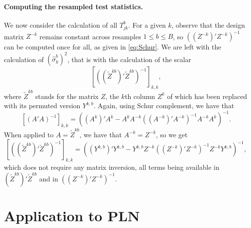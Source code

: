 \documentclass[a4paper, 10pt]{article}
\newcommand{\Zt}{\widetilde{Z}}
\begin{document}
\paragraph{Computing the resampled test statistics.}
We now consider the calculation of all $T_{jk}^b$. For a given $k$, observe that the design matrix $Z^{-k}$ remains constant across resamples $1 \leq b \leq B$, so $\left((Z^{-k})' Z^{-k}\right)^{-1}$ can be computed once for all, as given in \eqref{eq:Schur}. We are left with the calculation of $(\widehat{\sigma}^b_k)^2$, that is with the calculation of the scalar
$$
\left[\left((\Zt^{kb})' \Zt^{kb}\right)^{-1}\right]_{k, k},
$$
where $\Zt^{kb}$ stands for the matrix $Z$, the $k$th column $Z^k$ of which has been replaced with its permuted version $Y^{k, b}$. Again, using Schur complement, we have that
$$
[(A'A)^{-1}]_{k, k}  
=
\left((A^k)' A^k - A^k A^{-k} ((A^{-k})' A^{-k})^{-1} A^{-k} A^k \right)^{-1}.
$$
When applied to $A = \Zt^{kb}$, we have that $A^{-k} = Z^{-k}$, so we get
$$
\left[\left((\Zt^{kb})' \Zt^{kb}\right)^{-1}\right]_{k, k}
=
\left((Y^{k, b})' Y^{k, b} - Y^{k, b} Z^{-k} ((Z^{-k})' Z^{-k})^{-1} Z^{-k} Y^{k, b} \right)^{-1},
$$
which does not require any matrix inversion, all terms being available in $(\Zt^{kb})' \Zt^{kb}$ and in $((Z^{-k})' Z^{-k})^{-1}$.



\section{Application to PLN}
\end{document}
